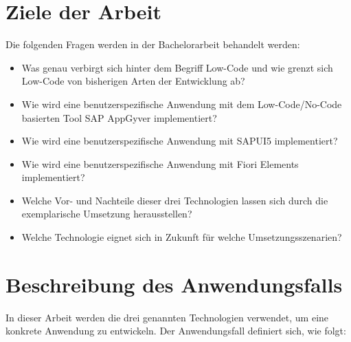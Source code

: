 \section{Ziele der Arbeit}
Die folgenden Fragen werden in der Bachelorarbeit behandelt werden:
\begin{itemize}[noitemsep]
\item Was genau verbirgt sich hinter dem Begriff Low-Code und wie grenzt sich Low-Code von bisherigen Arten der Entwicklung ab?
\item Wie wird eine benutzerspezifische Anwendung mit dem Low-Code/No-Code basierten Tool SAP AppGyver implementiert?
\item Wie wird eine benutzerspezifische Anwendung mit SAPUI5 implementiert?
\item Wie wird eine benutzerspezifische Anwendung mit Fiori Elements implementiert?
\item Welche Vor- und Nachteile dieser drei Technologien lassen sich durch die exemplarische Umsetzung herausstellen?
\item Welche Technologie eignet sich in Zukunft für welche Umsetzungsszenarien?
\end{itemize}


\section{Beschreibung des Anwendungsfalls}
In dieser Arbeit werden die drei genannten Technologien verwendet, um eine konkrete Anwendung zu entwickeln. Der Anwendungsfall definiert sich, wie folgt:

